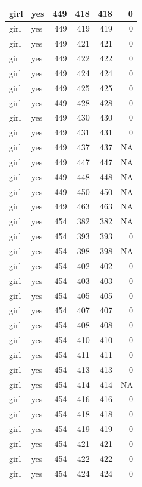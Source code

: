 \documentclass[man]{apa6}
\begin{document}
\begin{tabular}{l|l|r|r|r|r}
\hline
girl & yes & 449 & 418 & 418 & 0\\
\hline
girl & yes & 449 & 419 & 419 & 0\\
\hline
girl & yes & 449 & 421 & 421 & 0\\
\hline
girl & yes & 449 & 422 & 422 & 0\\
\hline
girl & yes & 449 & 424 & 424 & 0\\
\hline
girl & yes & 449 & 425 & 425 & 0\\
\hline
girl & yes & 449 & 428 & 428 & 0\\
\hline
girl & yes & 449 & 430 & 430 & 0\\
\hline
girl & yes & 449 & 431 & 431 & 0\\
\hline
girl & yes & 449 & 437 & 437 & NA\\
\hline
girl & yes & 449 & 447 & 447 & NA\\
\hline
girl & yes & 449 & 448 & 448 & NA\\
\hline
girl & yes & 449 & 450 & 450 & NA\\
\hline
girl & yes & 449 & 463 & 463 & NA\\
\hline
girl & yes & 454 & 382 & 382 & NA\\
\hline
girl & yes & 454 & 393 & 393 & 0\\
\hline
girl & yes & 454 & 398 & 398 & NA\\
\hline
girl & yes & 454 & 402 & 402 & 0\\
\hline
girl & yes & 454 & 403 & 403 & 0\\
\hline
girl & yes & 454 & 405 & 405 & 0\\
\hline
girl & yes & 454 & 407 & 407 & 0\\
\hline
girl & yes & 454 & 408 & 408 & 0\\
\hline
girl & yes & 454 & 410 & 410 & 0\\
\hline
girl & yes & 454 & 411 & 411 & 0\\
\hline
girl & yes & 454 & 413 & 413 & 0\\
\hline
girl & yes & 454 & 414 & 414 & NA\\
\hline
girl & yes & 454 & 416 & 416 & 0\\
\hline
girl & yes & 454 & 418 & 418 & 0\\
\hline
girl & yes & 454 & 419 & 419 & 0\\
\hline
girl & yes & 454 & 421 & 421 & 0\\
\hline
girl & yes & 454 & 422 & 422 & 0\\
\hline
girl & yes & 454 & 424 & 424 & 0\\

\end{tabular}
\end{document}
